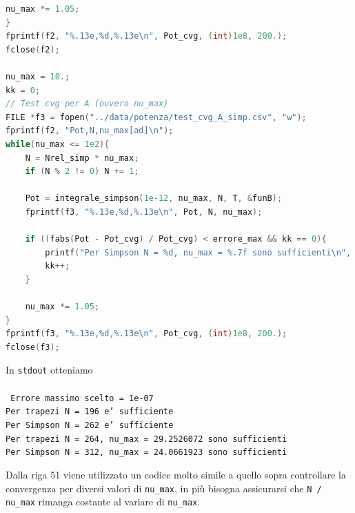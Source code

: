 \documentclass[a4paper, titlepage]{article}
\begin{document}
\begin{lstlisting}[language=C]
    nu_max *= 1.05;
}
fprintf(f2, "%.13e,%d,%.13e\n", Pot_cvg, (int)1e8, 200.);
fclose(f2);

nu_max = 10.;
kk = 0;
// Test cvg per A (ovvero nu_max)
FILE *f3 = fopen("../data/potenza/test_cvg_A_simp.csv", "w");
fprintf(f2, "Pot,N,nu_max[ad]\n");
while(nu_max <= 1e2){
    N = Nrel_simp * nu_max;
    if (N % 2 != 0) N += 1;

    Pot = integrale_simpson(1e-12, nu_max, N, T, &funB);
    fprintf(f3, "%.13e,%d,%.13e\n", Pot, N, nu_max);

    if ((fabs(Pot - Pot_cvg) / Pot_cvg) < errore_max && kk == 0){
        printf("Per Simpson N = %d, nu_max = %.7f sono sufficienti\n", N, nu_max);
        kk++;
    }

    nu_max *= 1.05;
}
fprintf(f3, "%.13e,%d,%.13e\n", Pot_cvg, (int)1e8, 200.);
fclose(f3);
\end{lstlisting}

In \texttt{stdout} otteniamo \\ \\
\texttt{
Errore massimo scelto = 1e-07 \\
Per trapezi N = 196 e' sufficiente \\
Per Simpson N = 262 e' sufficiente \\
Per trapezi N = 264, nu\_max = 29.2526072 sono sufficienti \\
Per Simpson N = 312, nu\_max = 24.0661923 sono sufficienti \\
}

Dalla riga 51 viene utilizzato un codice molto simile a quello sopra controllare la convergenza per diversi valori di \texttt{nu\_max}, in più bisogna assicurarsi che \texttt{N / nu\_max} rimanga costante al variare di \texttt{nu\_max}.
\end{document}
